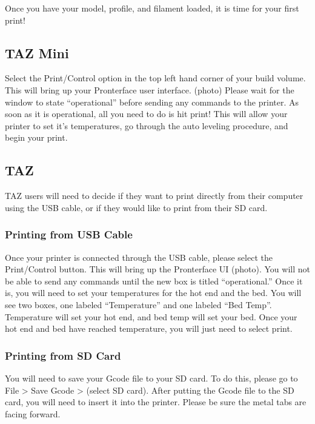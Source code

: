 Once you have your model, profile, and filament loaded, it is time for your first print! 

\subsection{TAZ Mini}

Select the Print/Control option in the top left hand corner of your build volume. This will bring up your Pronterface user interface. (photo) Please wait for the window to state “operational” before sending any commands to the printer. As soon as it is operational, all you need to do is hit print! This will allow your printer to set it's temperatures, go through the auto leveling procedure, and begin your print.

\subsection{TAZ}

TAZ users will need to decide if they want to print directly from their computer using the USB cable, or if they would like to print from their SD card. 

\subsubsection{Printing from USB Cable}

Once your printer is connected through the USB cable, please select the Print/Control button. This will bring up the Pronterface UI (photo). You will not be able to send any commands until the new box is titled “operational.” Once it is, you will need to set your temperatures for the hot end and the bed. You will see two boxes, one labeled “Temperature” and one labeled “Bed Temp”. Temperature will set your hot end, and bed temp will set your bed. Once your hot end and bed have reached temperature, you will just need to select print.

\subsubsection{Printing from SD Card}

You will need to save your Gcode file to your SD card. To do this, please go to File > Save Gcode > (select SD card). After putting the Gcode file to the SD card, you will need to insert it into the printer. Please be sure the metal tabs are facing forward. 

